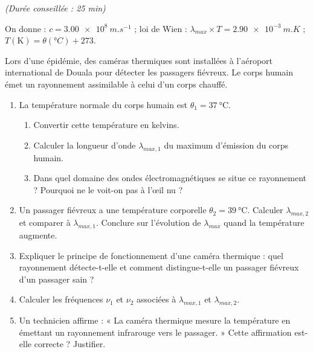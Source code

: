 \documentclass[11pt]{article}
\begin{document}
\begin{exercice}
\textit{(Durée conseillée : 25 min)}

On donne : $c = \SI{3,00e8}{m.s^{-1}}$ ; loi de Wien : $\lambda_{max} \times T = \SI{2,90e-3}{m.K}$ ; $T(\text{K}) = \theta(°C) + 273$.

Lors d'une épidémie, des caméras thermiques sont installées à l'aéroport international de Douala pour détecter les passagers fiévreux. Le corps humain émet un rayonnement assimilable à celui d'un corps chauffé.

\begin{enumerate}
\item La température normale du corps humain est $\theta_1 = \SI{37}{\celsius}$.
\begin{enumerate}
\item Convertir cette température en kelvins.
\item Calculer la longueur d'onde $\lambda_{max,1}$ du maximum d'émission du corps humain.
\item Dans quel domaine des ondes électromagnétiques se situe ce rayonnement ? Pourquoi ne le voit-on pas à l'œil nu ?
\end{enumerate}
\item Un passager fiévreux a une température corporelle $\theta_2 = \SI{39}{\celsius}$. Calculer $\lambda_{max,2}$ et comparer à $\lambda_{max,1}$. Conclure sur l'évolution de $\lambda_{max}$ quand la température augmente.
\item Expliquer le principe de fonctionnement d'une caméra thermique : quel rayonnement détecte-t-elle et comment distingue-t-elle un passager fiévreux d'un passager sain ?
\item Calculer les fréquences $\nu_1$ et $\nu_2$ associées à $\lambda_{max,1}$ et $\lambda_{max,2}$.
\item Un technicien affirme : « La caméra thermique mesure la température en émettant un rayonnement infrarouge vers le passager. » Cette affirmation est-elle correcte ? Justifier.
\end{enumerate}
\end{exercice}
\end{document}
